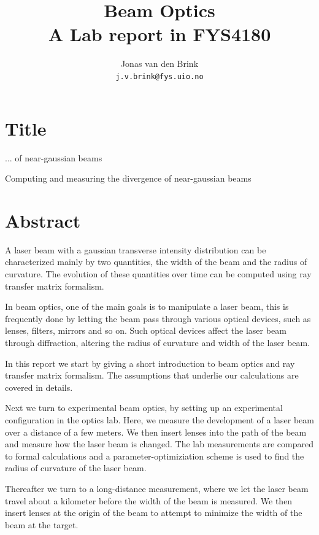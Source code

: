 \documentclass[a4paper, 11pt, notitlepage, english]{article}
\author{Jonas van den Brink \\ \texttt{j.v.brink@fys.uio.no}}
\title{Beam Optics \\ A Lab report in FYS4180}
\begin{document}
\maketitle

\vspace{1cm}

\tableofcontents

\clearpage

\section{Title}

... of near-gaussian beams

Computing and measuring the divergence of near-gaussian beams

\clearpage

\section{Abstract}
A laser beam with a gaussian transverse intensity distribution can be characterized mainly by two quantities, the width of the beam and the radius of curvature. The evolution of these quantities over time can be computed using ray transfer matrix formalism. 

In beam optics, one of the main goals is to manipulate a laser beam, this is frequently done by letting the beam pass through various optical devices, such as lenses, filters, mirrors and so on. Such optical devices affect the laser beam through diffraction, altering the radius of curvature and width of the laser beam.

In this report we start by giving a short introduction to beam optics and ray transfer matrix formalism. The assumptions that underlie our calculations are covered in details.

Next we turn to experimental beam optics, by setting up an experimental configuration in the optics lab. Here, we measure the development of a laser beam over a distance of a few meters. We then insert lenses into the path of the beam and measure how the laser beam is changed. The lab measurements are compared to formal calculations and a parameter-optimiziation scheme is used to find the radius of curvature of the laser beam.

Thereafter we turn to a long-distance measurement, where we let the laser beam travel about a kilometer before the width of the beam is measured. We then insert lenses at the origin of the beam to attempt to minimize the width of the beam at the target.
\end{document}
